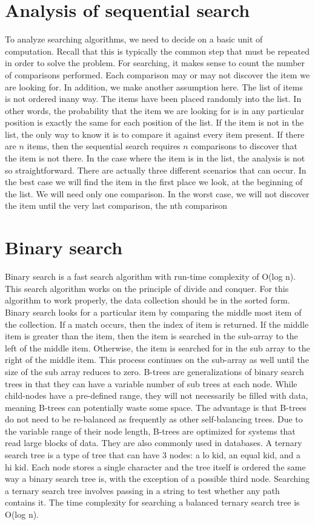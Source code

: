 \documentclass{article}
\begin{document}
\section*{Analysis of sequential search}To analyze searching algorithms, we need to decide 
on a basic unit of computation. Recall that this is 
typically the common step that must be repeated in 
order to solve the problem. For searching, it makes 
sense to count the number of comparisons performed. 
Each comparison may or may not discover the item 
we are looking for. In addition, we make another 
assumption here. The list of items is not ordered inany way. The items have been placed randomly into 
the list. In other words, the probability that the item 
we are looking for is in any particular position is 
exactly the same for each position of the list. 
If the item is not in the list, the only way to know it is 
to compare it against every item present. If there are 
\(n\) items, then the sequential search requires \(n\) 
comparisons to discover that the item is not there. In 
the case where the item is in the list, the analysis is 
not so straightforward. There are actually three 
different scenarios that can occur. In the best case we 
will find the item in the first place we look, at the 
beginning of the list. We will need only one 
comparison. In the worst case, we will not discover 
the item until the very last comparison, the nth 
comparison
\section*{Binary search}
Binary search is a fast search algorithm with run-time 
complexity of Ο(log n). This search algorithm works 
on the principle of divide and conquer. For this 
algorithm to work properly, the data collection should 
be in the sorted form. 
Binary search looks for a particular item by 
comparing the middle most item of the collection. If a 
match occurs, then the index of item is returned. If the 
middle item is greater than the item, then the item is 
searched in the sub-array to the left of the middle 
item. Otherwise, the item is searched for in the sub array to the right of the middle item. This process 
continues on the sub-array as well until the size of the 
sub array reduces to zero. B-trees are generalizations 
of binary search trees in that they can have a variable 
number of sub trees at each node. While child-nodes 
have a pre-defined range, they will not necessarily be 
filled with data, meaning B-trees can potentially waste 
some space. The advantage is that B-trees do not need 
to be re-balanced as frequently as other self-balancing 
trees. 
Due to the variable range of their node length, B-trees 
are optimized for systems that read large blocks of 
data. They are also commonly used in databases. A 
ternary search tree is a type of tree that can have 3 
nodes: a lo kid, an equal kid, and a hi kid. Each node 
stores a single character and the tree itself is ordered 
the same way a binary search tree is, with the 
exception of a possible third node. Searching a ternary 
search tree involves passing in a string to test whether 
any path contains it. The time complexity for 
searching a balanced ternary search tree is O(log n).
\end{document}

